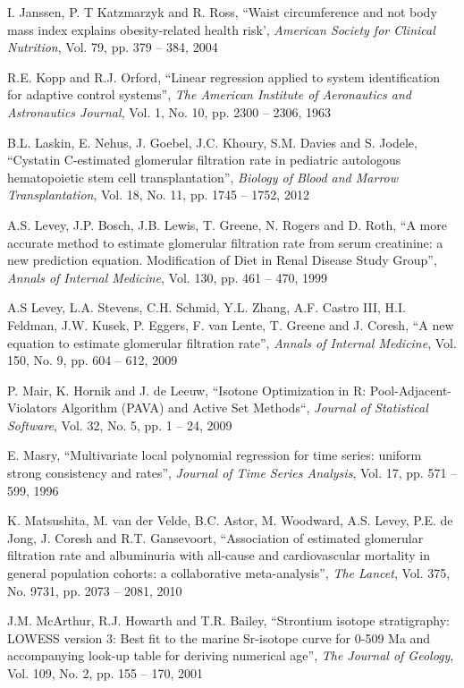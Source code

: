 \documentclass[10pt,final]{siamltex}
\begin{document}
\begin{thebibliography}{99}
   I. Janssen, P. T Katzmarzyk and R. Ross, ``Waist circumference and not body mass index explains obesity-related health risk', \textit{American Society for Clinical Nutrition}, Vol. 79, pp. 379 -- 384, 2004

   R.E. Kopp and R.J. Orford, ``Linear regression applied to system identification for adaptive control systems'', \textit{The American Institute of Aeronautics and Astronautics Journal}, Vol. 1, No. 10, pp. 2300 -- 2306, 1963

   B.L. Laskin, E. Nehus, J. Goebel, J.C. Khoury, S.M. Davies and S. Jodele, ``Cystatin C-estimated glomerular filtration rate in pediatric autologous hematopoietic stem cell transplantation'', \textit{Biology of Blood and Marrow Transplantation}, Vol. 18, No. 11, pp. 1745 -- 1752, 2012

   A.S. Levey, J.P. Bosch, J.B. Lewis, T. Greene, N. Rogers and D. Roth, ``A more accurate method to estimate glomerular filtration rate from serum creatinine: a new prediction equation. Modification of Diet in Renal Disease Study Group'', \textit{Annals of Internal Medicine}, Vol. 130, pp. 461 -- 470, 1999

   A.S Levey, L.A. Stevens, C.H. Schmid, Y.L. Zhang, A.F. Castro III, H.I. Feldman, J.W. Kusek, P. Eggers, F. van Lente, T. Greene and J. Coresh, ``A new equation to estimate glomerular filtration rate'', \textit{Annals of Internal Medicine}, Vol. 150, No. 9, pp. 604 -- 612, 2009

   P. Mair, K. Hornik and J. de Leeuw, ``Isotone Optimization in R: Pool-Adjacent-Violators Algorithm (PAVA) and Active Set Methods``, \textit{Journal of Statistical Software}, Vol. 32, No. 5, pp. 1 -- 24, 2009

   E. Masry, ``Multivariate local polynomial regression for time series: uniform strong consistency and rates'', \textit{Journal of Time Series Analysis}, Vol. 17, pp. 571 -- 599, 1996

   K. Matsushita, M. van der Velde, B.C. Astor, M. Woodward, A.S. Levey, P.E. de Jong, J. Coresh and R.T. Gansevoort, ``Association of estimated glomerular filtration rate and albuminuria with all-cause and cardiovascular mortality in general population cohorts: a collaborative meta-analysis'', \textit{The Lancet}, Vol. 375, No. 9731, pp. 2073 -- 2081, 2010

   J.M. McArthur, R.J. Howarth and T.R. Bailey, ``Strontium isotope stratigraphy: LOWESS version 3: Best fit to the marine Sr-isotope curve for 0-509 Ma and accompanying look-up table for deriving numerical age'', \textit{The Journal of Geology}, Vol. 109, No. 2, pp. 155 -- 170, 2001


\end{thebibliography}
\end{document}
